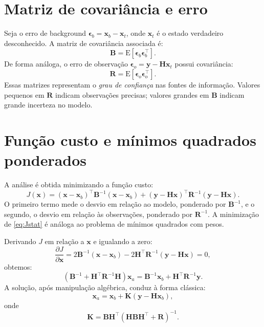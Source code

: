 \section{Matriz de covariância e erro}
Seja o erro de background $\boldsymbol{\epsilon}_b = \mathbf{x}_b - \mathbf{x}_t$, onde $\mathbf{x}_t$ é o estado verdadeiro desconhecido.  
A matriz de covariância associada é:
\[
\mathbf{B} = \mathrm{E}[\boldsymbol{\epsilon}_b \boldsymbol{\epsilon}_b^\top].
\]
De forma análoga, o erro de observação $\boldsymbol{\epsilon}_o = \mathbf{y} - \mathbf{H}\mathbf{x}_t$ possui covariância:
\[
\mathbf{R} = \mathrm{E}[\boldsymbol{\epsilon}_o \boldsymbol{\epsilon}_o^\top].
\]
Essas matrizes representam o \emph{grau de confiança} nas fontes de informação.  
Valores pequenos em $\mathbf{R}$ indicam observações precisas; valores grandes em $\mathbf{B}$ indicam grande incerteza no modelo.

\section{Função custo e mínimos quadrados ponderados}
A análise é obtida minimizando a função custo:
\begin{equation}
J(\mathbf{x}) = (\mathbf{x} - \mathbf{x}_b)^\top \mathbf{B}^{-1} (\mathbf{x} - \mathbf{x}_b)
+ (\mathbf{y} - \mathbf{H}\mathbf{x})^\top \mathbf{R}^{-1} (\mathbf{y} - \mathbf{H}\mathbf{x}).
\label{eq:Jstat}
\end{equation}
O primeiro termo mede o desvio em relação ao modelo, ponderado por $\mathbf{B}^{-1}$, e o segundo, o desvio em relação às observações, ponderado por $\mathbf{R}^{-1}$.  
A minimização de \eqref{eq:Jstat} é análoga ao problema de mínimos quadrados com pesos.

Derivando $J$ em relação a $\mathbf{x}$ e igualando a zero:
\[
\frac{\partial J}{\partial \mathbf{x}} = 2\mathbf{B}^{-1}(\mathbf{x}-\mathbf{x}_b)
- 2\mathbf{H}^\top \mathbf{R}^{-1}(\mathbf{y}-\mathbf{H}\mathbf{x}) = 0,
\]
obtemos:
\[
(\mathbf{B}^{-1} + \mathbf{H}^\top \mathbf{R}^{-1}\mathbf{H})\mathbf{x}_a
= \mathbf{B}^{-1}\mathbf{x}_b + \mathbf{H}^\top \mathbf{R}^{-1}\mathbf{y}.
\]
A solução, após manipulação algébrica, conduz à forma clássica:
\begin{equation}
\boxed{\mathbf{x}_a = \mathbf{x}_b + \mathbf{K}(\mathbf{y} - \mathbf{H}\mathbf{x}_b),}
\label{eq:xa-final}
\end{equation}
onde
\begin{equation}
\boxed{\mathbf{K} = \mathbf{B}\mathbf{H}^\top (\mathbf{H}\mathbf{B}\mathbf{H}^\top + \mathbf{R})^{-1}.}
\label{eq:kalman-gain}
\end{equation}

